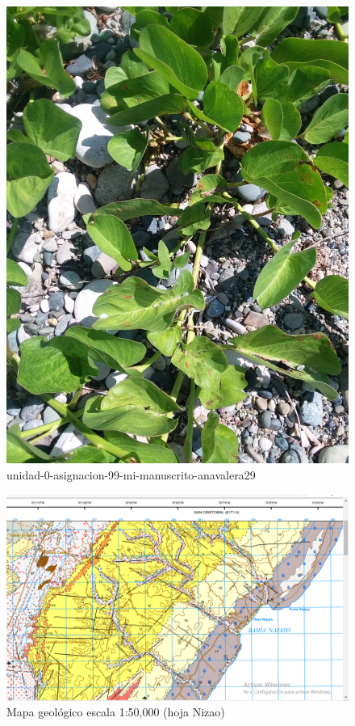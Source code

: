 \documentclass[11pt,]{article}
\begin{document}
\begin{figure}
\centering
\includegraphics{Ipomoea_Pescaprea.jpg}
\caption{unidad-0-asignacion-99-mi-manuscrito-anavalera29\label{ipomoea}}
\end{figure}

\begin{figure}
\centering
\includegraphics{mapa_bahia_najayo.png}
\caption{Mapa geológico escala 1:50,000 (hoja Nizao)\label{mapageo50k}}
\end{figure}
\end{document}
